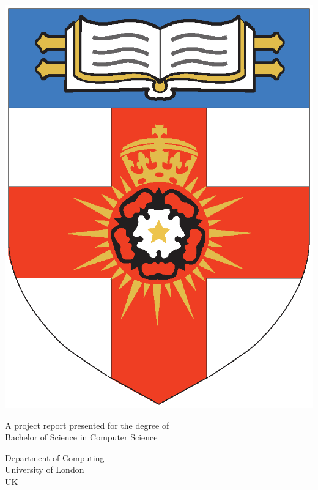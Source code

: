 \makeatletter
\begin{titlepage}
   \begin{center}
       \vspace*{1cm}

       \Huge
       \textbf{\projectTitle}

       \vspace{0.5cm}
       \Large
       \projectSubtitle
            
       \vspace{1.5cm}

       \textbf{\projectAuthor}

       \vfill

       \includegraphics[scale=0.5]{assets/University-of-London}

       \vfill
            
       A project report presented for the degree of\\
       Bachelor of Science in Computer Science
            
       \vspace{0.8cm}
     
       \Large
       Department of Computing\\
       University of London\\
       UK\\
       \projectDate
       
   \end{center}
\end{titlepage}
\makeatother
